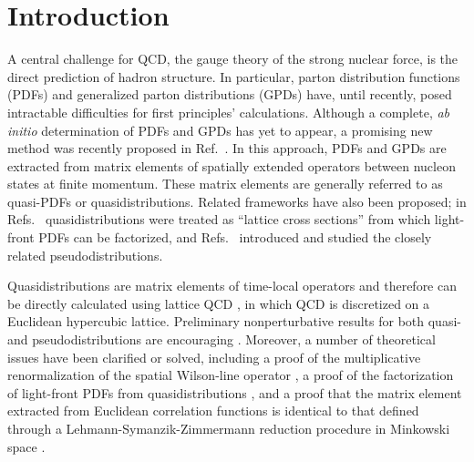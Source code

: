 \section{Introduction}

A central challenge for QCD, the gauge theory of the strong nuclear force, is the direct prediction of hadron structure. In particular, parton distribution functions (PDFs) and generalized parton distributions (GPDs) have, until recently, posed intractable difficulties for first principles' calculations. Although a complete, \textit{ab initio} determination of PDFs and GPDs has yet to appear, a promising new method was recently proposed in Ref.~\cite{Ji:2013dva}. In this approach, PDFs and GPDs are extracted from matrix elements of spatially extended operators between nucleon states at finite momentum. These matrix elements are generally referred to as quasi-PDFs or quasidistributions. Related frameworks have also been proposed; in Refs.~\cite{Ma:2014jla,Ma:2014jga,Ma:2017pxb} quasidistributions were treated as ``lattice cross sections'' from which light-front PDFs can be factorized, and Refs.~\cite{Radyushkin:2016hsy,Radyushkin:2017cyf,Orginos:2017kos} introduced and studied the closely related pseudodistributions.

Quasidistributions are matrix elements of time-local operators and therefore can be directly calculated using lattice QCD \cite{Carlson:2017gpk,Briceno:2017cpo}, in which QCD is discretized on a Euclidean hypercubic lattice. Preliminary nonperturbative results for both quasi- and pseudodistributions are encouraging \cite{Lin:2014zya,Alexandrou:2015rja,Chen:2016utp,Orginos:2017kos,Zhang:2017bzy,Alexandrou:2017qpu}. Moreover, a number of theoretical issues \cite{Li:2016amo,Rossi:2017muf,Carlson:2017gpk} have been clarified or solved, including a proof of the multiplicative renormalization of the spatial Wilson-line operator \cite{Ji:2017oey,Ishikawa:2017faj}, a proof of the factorization of light-front PDFs from quasidistributions \cite{Ma:2014jla,Ma:2014jga}, and a proof that the matrix element extracted from Euclidean correlation functions is identical to that defined through a Lehmann-Symanzik-Zimmermann reduction procedure in Minkowski space \cite{Briceno:2017cpo,Xiong:2017jtn,Ji:2017rah}.

